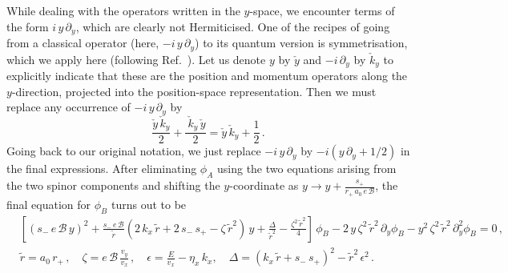 \documentclass[aps,prb, onecolumn, nofootinbib, citeautoscript,10pt]{revtex4-2}
\def \nn{\nonumber \\}
\begin{document}
\begin{widetext}
While dealing with the operators written in the $y$-space, we encounter terms of the form $i\, y\, \partial_y $, which are clearly not Hermiticised. One of the recipes of going from a classical operator (here, $ -i\, y\, \partial_y$) to its quantum version is symmetrisation, which we apply here (following Ref.~\cite{strained-dirac-franz}). Let us denote $y$ by $\check y$ and $-i\, \partial_y$ by $\check k_y$ to explicitly indicate that these are the position and momentum operators along the $y$-direction, projected into the position-space representation. Then we must replace any occurrence of $ -i\, y \,\partial_y $ by
$$ \frac{\check{y} \,\check{k}_y}{2}  +   \frac{\ \check{k}_y \, \check{y} }{2} = \check{y} \,\check{k}_y + \frac{1}{2} \,.$$
Going back to our original notation, we just replace $ -i\, y \,\partial_y $ by $-i\left ( y\,\partial_y + 1/2 \right)$ in the final expressions. After eliminating $\phi_A$ using the two equations arising from the two spinor components and shifting the $y$-coordinate as $ y\rightarrow y + 
\frac{s_+}{r_+ \,a_0\,  e\, {\mathcal B}}$, the final equation for $\phi_B$ turns out to be
\begin{align}
\label{eqdiffea}
& \left[(s_{-}\,e \, {\mathcal B}\,y)^2 + \frac{s_{-} \,e \, {\mathcal B}}{\tilde{r}}(2\,k_x\,\tilde{r}+2\,s_{-}\,s_+
-\zeta\,\tilde{r}^2)\,y+\frac{\Delta}{\tilde{r}^2}-\frac{\zeta^2\,\tilde{r}^2}{4} \right] \, \phi_B 
-2 \,y \, \zeta^2 \, \tilde{r}^2 \, \partial_y \phi_B-y^2 \, \zeta^2 \, \tilde{r}^2 \, \partial^2_y \phi_B = 0\,,
\nn & \tilde{r} = a_0 \, r_+ \,, \quad \zeta =  e \, {\mathcal B} \, \frac{v_y}{v_x} \,, \quad
\epsilon = \frac{E}{v_x}- \eta_x \, k_x, \quad
\Delta = (k_x \, \tilde r+ s_{-} \, s_+ )^2-\tilde r^2 \, \epsilon^2 \,.
\end{align}

\end{widetext}
\end{document}

